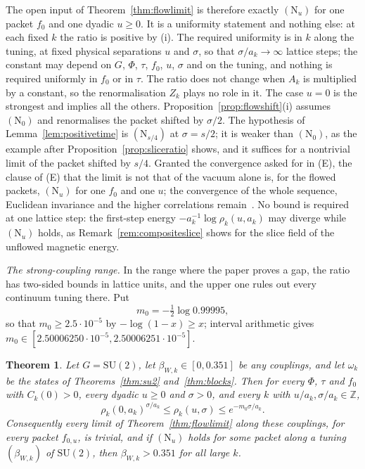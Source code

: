 \documentclass[11pt]{amsart}
\newtheorem{theorem}{Theorem}[section]
\theoremstyle{definition}
\theoremstyle{remark}
\numberwithin{equation}{section}
\newcommand{\Z}{\mathbb{Z}}
\newcommand{\SU}{\mathrm{SU}}
\begin{document}
The open input of Theorem~\ref{thm:flowlimit} is therefore exactly
$(\mathrm N_u)$ for one packet $f_0$ and one dyadic $u\ge0$. It is a uniformity
statement and nothing else: at each fixed $k$ the ratio is positive by (i).
The required uniformity is in $k$ along the tuning, at fixed physical
separations $u$ and $\sigma$, so that $\sigma/a_k\to\infty$ lattice steps;
the constant may depend on $G$, $\Phi$, $\tau$, $f_0$, $u$, $\sigma$ and on the
tuning, and nothing is required uniformly in $f_0$ or in $\tau$. The ratio
does not change when $A_k$ is multiplied by a constant, so the renormalisation
$Z_k$ plays no role in it. The case $u=0$ is the strongest and implies all the
others. Proposition~\ref{prop:flowshift}(i) assumes $(\mathrm N_0)$ and
renormalises the packet shifted by $\sigma/2$. The hypothesis of
Lemma~\ref{lem:positivetime} is $(\mathrm N_{s/4})$ at $\sigma=s/2$; it is
weaker than $(\mathrm N_0)$, as the example after
Proposition~\ref{prop:sliceratio} shows, and it suffices for a nontrivial
limit of the packet shifted by $s/4$. Granted the convergence asked for in (E), the
clause of (E) that the limit is not that of the vacuum alone is, for the
flowed packets, $(\mathrm N_u)$ for one $f_0$ and one $u$; the convergence of
the whole sequence, Euclidean invariance and the higher correlations
remain~\cite{JW06}.
No bound is required at one lattice step: the first-step energy
$-a_k^{-1}\log\rho_k(u,a_k)$ may diverge while $(\mathrm N_u)$ holds, as
Remark~\ref{rem:compositeslice} shows for the slice field of the unflowed
magnetic energy.

\emph{The strong-coupling range.} In the range where the paper proves a
gap, the ratio has two-sided bounds in lattice units, and the upper one rules
out every continuum tuning there. Put
\[
m_0=-\tfrac12\log0.99995 ,
\]
so that $m_0\ge2.5\cdot10^{-5}$ by $-\log(1-x)\ge x$; interval arithmetic gives
$m_0\in[2.50006250\cdot10^{-5},2.50006251\cdot10^{-5}]$.

\begin{theorem}\label{thm:strongratio}
Let $G=\SU(2)$, let $\beta_{W,k}\in[0,0.351]$ be any couplings, and let
$\omega_k$ be the states of Theorems~\ref{thm:su2} and~\ref{thm:blocks}. Then
for every $\Phi$, $\tau$ and $f_0$ with $C_k(0)>0$, every dyadic $u\ge0$ and
$\sigma>0$, and every $k$ with $u/a_k,\sigma/a_k\in\Z$,
\[
\rho_k(0,a_k)^{\sigma/a_k}\le\rho_k(u,\sigma)\le e^{-m_0\sigma/a_k} .
\]
Consequently every limit of Theorem~\textup{\ref{thm:flowlimit}} along these
couplings, for every packet $f_{0,u}$, is trivial, and if $(\mathrm N_u)$ holds
for some packet along a tuning $(\beta_{W,k})$ of $\SU(2)$, then
$\beta_{W,k}>0.351$ for all large $k$.
\end{theorem}
\end{document}
